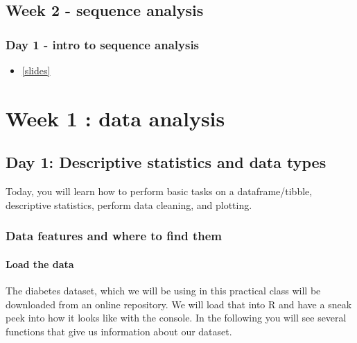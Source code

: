 \documentclass[
]{book}
\providecommand{\tightlist}{%
  \setlength{\itemsep}{0pt}\setlength{\parskip}{0pt}}
\begin{document}
\hypertarget{week-2---sequence-analysis}{%
\section{Week 2 - sequence analysis}\label{week-2---sequence-analysis}}

\hypertarget{day-1---intro-to-sequence-analysis}{%
\subsection{Day 1 - intro to sequence analysis}\label{day-1---intro-to-sequence-analysis}}

\begin{itemize}
\tightlist
\item
  \href{./slides/GKBioinfo_week2.pdf}{{[}slides{]}}
\end{itemize}

\hypertarget{week-1-data-analysis}{%
\chapter*{Week 1 : data analysis}\label{week-1-data-analysis}}

\hypertarget{day-1-descriptive-statistics-and-data-types}{%
\section*{Day 1: Descriptive statistics and data types}\label{day-1-descriptive-statistics-and-data-types}}

Today, you will learn how to perform basic tasks on a dataframe/tibble, descriptive statistics, perform data cleaning, and plotting.

\hypertarget{data-features-and-where-to-find-them}{%
\subsection{Data features and where to find them}\label{data-features-and-where-to-find-them}}

\hypertarget{load-the-data}{%
\subsubsection{Load the data}\label{load-the-data}}

The diabetes dataset, which we will be using in this practical class will be downloaded from an online repository.
We will load that into R and have a sneak peek into how it looks like with the console.
In the following you will see several functions that give us information about our dataset.
\end{document}

